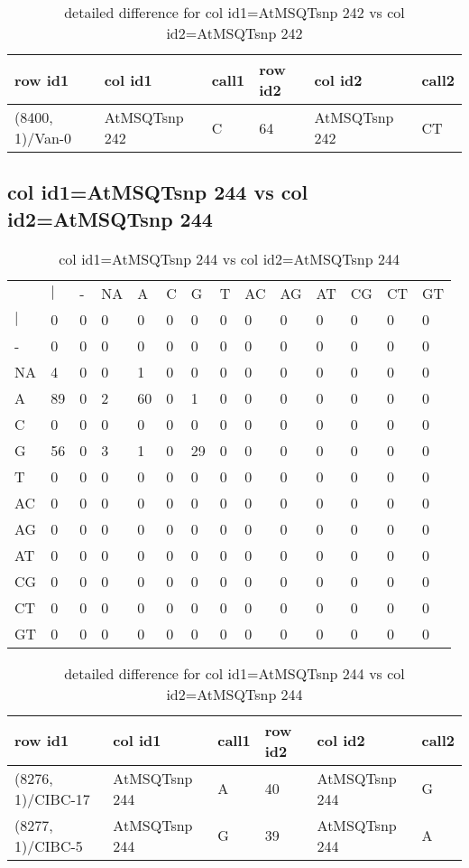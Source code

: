 \begin{center}
\begin{longtable}{|l|l|l|l|l|l|}
\caption{detailed difference for col id1=AtMSQTsnp 242 vs col id2=AtMSQTsnp 242} \label{table_dm605}\\
\hline
row id1&col id1&call1&row id2&col id2&call2\\
\hline
(8400, 1)/Van-0&AtMSQTsnp 242&C&64&AtMSQTsnp 242&CT\\
\hline
\end{longtable}
\end{center}

\subsection{col id1=AtMSQTsnp 244 vs col id2=AtMSQTsnp 244}
\begin{center}
\begin{longtable}{|l|l|l|l|l|l|l|l|l|l|l|l|l|l|}
\caption{col id1=AtMSQTsnp 244 vs col id2=AtMSQTsnp 244} \label{table_dm606}\\
\hline
\\
\hline
&$|$&-&NA&A&C&G&T&AC&AG&AT&CG&CT&GT\\
$|$&0&0&0&0&0&0&0&0&0&0&0&0&0\\
-&0&0&0&0&0&0&0&0&0&0&0&0&0\\
NA&4&0&0&1&0&0&0&0&0&0&0&0&0\\
A&89&0&2&60&0&1&0&0&0&0&0&0&0\\
C&0&0&0&0&0&0&0&0&0&0&0&0&0\\
G&56&0&3&1&0&29&0&0&0&0&0&0&0\\
T&0&0&0&0&0&0&0&0&0&0&0&0&0\\
AC&0&0&0&0&0&0&0&0&0&0&0&0&0\\
AG&0&0&0&0&0&0&0&0&0&0&0&0&0\\
AT&0&0&0&0&0&0&0&0&0&0&0&0&0\\
CG&0&0&0&0&0&0&0&0&0&0&0&0&0\\
CT&0&0&0&0&0&0&0&0&0&0&0&0&0\\
GT&0&0&0&0&0&0&0&0&0&0&0&0&0\\
\hline
\end{longtable}
\end{center}

\begin{center}
\begin{longtable}{|l|l|l|l|l|l|}
\caption{detailed difference for col id1=AtMSQTsnp 244 vs col id2=AtMSQTsnp 244} \label{table_dm607}\\
\hline
row id1&col id1&call1&row id2&col id2&call2\\
\hline
(8276, 1)/CIBC-17&AtMSQTsnp 244&A&40&AtMSQTsnp 244&G\\
(8277, 1)/CIBC-5&AtMSQTsnp 244&G&39&AtMSQTsnp 244&A\\
\hline
\end{longtable}
\end{center}

